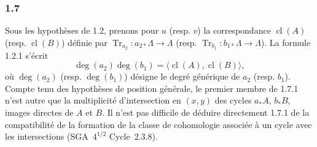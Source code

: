 \documentclass[11pt]{article}
\providecommand{\cl}{\operatorname{cl}}
\providecommand{\Tr}{\operatorname{Tr}}
\begin{document}
\subsubsection*{1.7}
Sous les hypothèses de 1.2, prenons pour $u$ (resp. $v$) la correspondance $\cl(A)$ (resp. $\cl(B)$) définie par $\Tr_{a_2}:a_{2*}\Lambda\to\Lambda$ (resp. $\Tr_{b_1}:b_{1*}\Lambda\to\Lambda$). La formule 1.2.1 s'écrit
\begin{equation}\tag{1.7.1}
\deg(a_2)\deg(b_1)=\langle \cl(A),\cl(B)\rangle,
\end{equation}
où $\deg(a_2)$ (resp. $\deg(b_1)$) désigne le degré générique de $a_2$ (resp. $b_1$). Compte tenu des hypothèses de position générale, le premier membre de 1.7.1 n'est autre que la multiplicité d'intersection en $(x,y)$ des cycles $a_*A$, $b_*B$, images directes de $A$ et $B$. Il n'est pas difficile de déduire directement 1.7.1 de la compatibilité de la formation de la classe de cohomologie associée à un cycle avec les intersections (SGA~$4^{1/2}$ Cycle~2.3.8).
\end{document}
